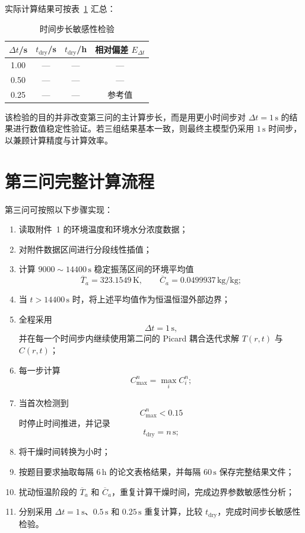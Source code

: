\documentclass[UTF8,a4paper,12pt]{ctexart}
\begin{document}
实际计算结果可按表~\ref{tab:dt_sensitivity} 汇总：
\begin{table}[htbp]
    \centering
    \caption{时间步长敏感性检验}
    \label{tab:dt_sensitivity}
    \begin{tabular}{cccc}
        \toprule
        $\Delta t$/s & $t_{\mathrm{dry}}$/s & $t_{\mathrm{dry}}$/h & 相对偏差 $E_{\Delta t}$ \\
        \midrule
        1.00 & --- & --- & --- \\
        0.50 & --- & --- & --- \\
        0.25 & --- & --- & 参考值 \\
        \bottomrule
    \end{tabular}
\end{table}

该检验的目的并非改变第三问的主计算步长，而是用更小时间步对 $\Delta t=1\,\mathrm{s}$ 的结果进行数值稳定性验证。若三组结果基本一致，则最终主模型仍采用 $1\,\mathrm{s}$ 时间步，以兼顾计算精度与计算效率。

\section{第三问完整计算流程}

第三问可按照以下步骤实现：

\begin{enumerate}
    \item 读取附件~1 的环境温度和环境水分浓度数据；
    \item 对附件数据区间进行分段线性插值；
    \item 计算 $9000\sim14400\,\mathrm{s}$ 稳定振荡区间的环境平均值
    \[
    \overline T_a=323.1549\,\mathrm{K},
    \qquad
    \overline C_a=0.0499937\,\mathrm{kg/kg};
    \]
    \item 当 $t>14400\,\mathrm{s}$ 时，将上述平均值作为恒温恒湿外部边界；
    \item 全程采用
    \[
    \Delta t=1\,\mathrm{s},
    \]
    并在每一个时间步内继续使用第二问的 Picard 耦合迭代求解 $T(r,t)$ 与 $C(r,t)$；
    \item 每一步计算
    \[
    C_{\max}^n=\max_i C_i^n;
    \]
    \item 当首次检测到
    \[
    C_{\max}^n<0.15
    \]
    时停止时间推进，并记录
    \[
    t_{\mathrm{dry}}=n\,\mathrm{s};
    \]
    \item 将干燥时间转换为小时；
    \item 按题目要求抽取每隔 $6\,\mathrm{h}$ 的论文表格结果，并每隔 $60\,\mathrm{s}$ 保存完整结果文件；
    \item 扰动恒温阶段的 $\overline T_a$ 和 $\overline C_a$，重复计算干燥时间，完成边界参数敏感性分析；
    \item 分别采用 $\Delta t=1\,\mathrm{s}$、$0.5\,\mathrm{s}$ 和 $0.25\,\mathrm{s}$ 重复计算，比较 $t_{\mathrm{dry}}$，完成时间步长敏感性检验。
\end{enumerate}
\end{document}
